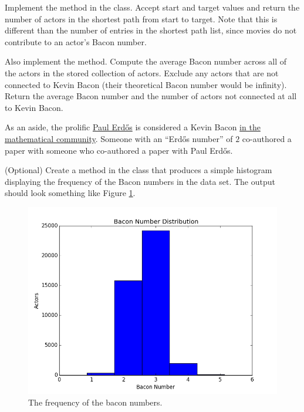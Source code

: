 \begin{problem}
Implement the  method in the  class.
Accept start and target values and return the number of actors in the shortest path from start to target.
Note that this is different than the number of entries in the shortest path list, since movies do not contribute to an actor's Bacon number.

Also implement the  method.
Compute the average Bacon number across all of the actors in the stored collection of actors.
Exclude any actors that are not connected to Kevin Bacon (their theoretical Bacon number would be infinity).
Return the average Bacon number and the number of actors not connected at all to Kevin Bacon.
\end{problem}

As an aside, the prolific \href{https://en.wikipedia.org/wiki/Erd%C5%91s_number}{Paul Erd\H{o}s} is considered a Kevin Bacon \href{https://xkcd.com/599/}{in the mathematical community}.
Someone with an ``Erd\H{o}s number'' of $2$ co-authored a paper with someone who co-authored a paper with Paul Erd\H{o}s.

\begin{problem}
(Optional) Create a  method in the  class that produces a simple histogram displaying the frequency of the Bacon numbers in the data set.
The output should look something like Figure \ref{fig:bacon_numbers}.
\begin{figure}[H]
\includegraphics[width=\textwidth]{figures/baconDistribution.png}
\caption{The frequency of the bacon numbers.}
\label{fig:bacon_numbers}
\end{figure}
\end{problem}



